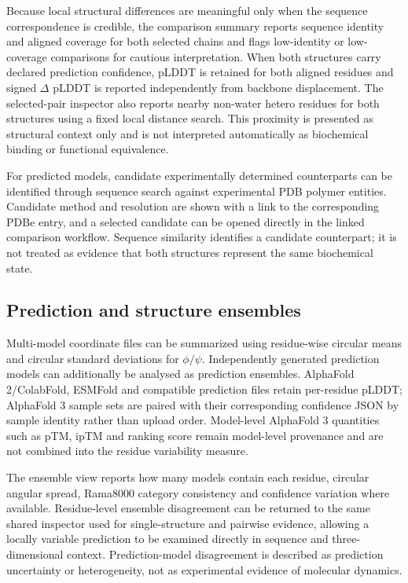 \documentclass[11pt]{article}
\begin{document}
Because local structural differences are meaningful only when the sequence correspondence is credible, the comparison summary reports sequence identity and aligned coverage for both selected chains and flags low-identity or low-coverage comparisons for cautious interpretation. When both structures carry declared prediction confidence, pLDDT is retained for both aligned residues and signed $\Delta$ pLDDT is reported independently from backbone displacement. The selected-pair inspector also reports nearby non-water hetero residues for both structures using a fixed local distance search. This proximity is presented as structural context only and is not interpreted automatically as biochemical binding or functional equivalence.

For predicted models, candidate experimentally determined counterparts can be identified through sequence search against experimental PDB polymer entities. Candidate method and resolution are shown with a link to the corresponding PDBe entry, and a selected candidate can be opened directly in the linked comparison workflow. Sequence similarity identifies a candidate counterpart; it is not treated as evidence that both structures represent the same biochemical state.

\subsection{Prediction and structure ensembles}

Multi-model coordinate files can be summarized using residue-wise circular means and circular standard deviations for $\phi/\psi$. Independently generated prediction models can additionally be analysed as prediction ensembles. AlphaFold 2/ColabFold, ESMFold and compatible prediction files retain per-residue pLDDT; AlphaFold 3 sample sets are paired with their corresponding confidence JSON by sample identity rather than upload order. Model-level AlphaFold 3 quantities such as pTM, ipTM and ranking score remain model-level provenance and are not combined into the residue variability measure.

The ensemble view reports how many models contain each residue, circular angular spread, Rama8000 category consistency and confidence variation where available. Residue-level ensemble disagreement can be returned to the same shared inspector used for single-structure and pairwise evidence, allowing a locally variable prediction to be examined directly in sequence and three-dimensional context. Prediction-model disagreement is described as prediction uncertainty or heterogeneity, not as experimental evidence of molecular dynamics.
\end{document}
